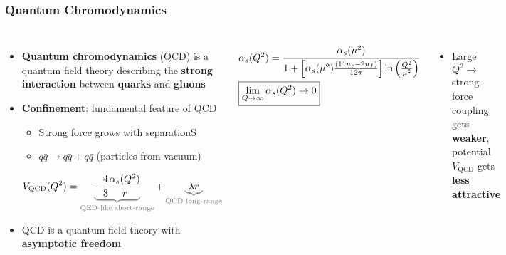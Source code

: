 \begin{frame}
  \frametitle{\textbf{Quantum Chromodynamics}}
  \begin{columns}
    \begin{itemize}
    \item \textbf{Quantum chromodynamics} (QCD) is a quantum field theory describing the \textbf{strong interaction} between \textbf{quarks} and \textbf{gluons}
    \item \textbf{Confinement}: fundamental feature of QCD
      \begin{itemize}
      \item Strong force grows with separationS
      \item $q\bar{q} \to q\bar{q} + q\bar{q}$ (particles from vacuum)
      \end{itemize}
      \begin{align*}
        V_{\text{QCD}}(Q^2) = \color{gray}\underbrace{\color{black}-\cfrac{4}{3}\cfrac{\alpha_s(Q^2)}{r}}_{\text{QED-like short-range}} \color{black} + \color{gray} \underbrace{\color{black}\lambda r}_{\text{QCD long-range}}
      \end{align*}
    \item QCD is a quantum field theory with \textbf{asymptotic freedom}
    \end{itemize}
    \begin{align*}
      &\alpha_s(Q^2) = \cfrac{\alpha_s(\mu^2)}{1 + \left[\alpha_s(\mu^2)\frac{(11n_c - 2n_f)}{12\pi}\right]\ln\left(\frac{Q^2}{\mu^2}\right)} \\
      & \boxed{\lim_{Q \to \infty}\alpha_s(Q^2) \to 0}
    \end{align*}

    \begin{itemize}
    \item Large $Q^2 \to$ strong-force coupling gets \textbf{weaker}, potential $V_{\text{QCD}}$ gets \textbf{less attractive}
    \end{itemize}



    \centering

    \


\end{columns}
\end{frame}
